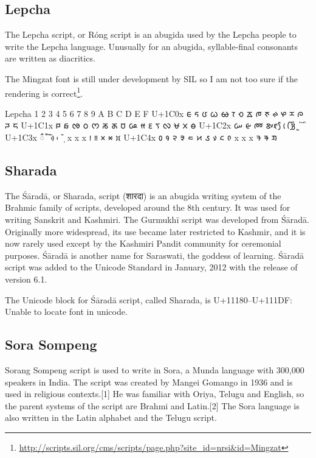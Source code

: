 \subsection{Lepcha}
\newfontfamily{}

The Lepcha script, or Róng script is an abugida used by the Lepcha people to write the Lepcha language. Unusually for an abugida, syllable-final consonants are written as diacritics.

The Mingzat font is still under development by SIL so I am not too sure if the rendering is correct\footnote{\url{http://scripts.sil.org/cms/scripts/page.php?site_id=nrsi&id=Mingzat}}.

\begin{scriptexample}[]{Lepcha}
\bgroup
\lepcha
{}	1	2	3	4	5	6	7	8	9	A	B	C	D	E	F
U+1C0x	 ᰀ	ᰁ	ᰂ	ᰃ	ᰄ	ᰅ	ᰆ	ᰇ	ᰈ	ᰉ	ᰊ	ᰋ	ᰌ	ᰍ	ᰎ	ᰏ
U+1C1x	 ᰐ	ᰑ	ᰒ	ᰓ	ᰔ	ᰕ	ᰖ	ᰗ	ᰘ	ᰙ	ᰚ	ᰛ	ᰜ	ᰝ	ᰞ	ᰟ
U+1C2x	 ᰠ	ᰡ	ᰢ	ᰣ	ᰤ	ᰥ	ᰦ	ᰧ	ᰨ	ᰩ	ᰪ	ᰫ	ᰬ	ᰭ	ᰮ	ᰯ
U+1C3x	 ᰰ	ᰱ	ᰲ	ᰳ	ᰴ	ᰵ	ᰶ	᰷	x	x	x	᰻	᰼	᰽	᰾	᰿
U+1C4x	 ᱀	᱁	᱂	᱃	᱄	᱅	᱆	᱇	᱈	᱉	x	x	x	ᱍ	ᱎ	ᱏ

\egroup
\end{scriptexample}

\subsection{Sharada}

The Śāradā, or Sharada, script (शारदा) is an abugida writing system of the Brahmic family of scripts, developed around the 8th century. It was used for writing Sanskrit and Kashmiri. The Gurmukhī script was developed from Śāradā. Originally more widespread, its use became later restricted to Kashmir, and it is now rarely used except by the Kashmiri Pandit community for ceremonial purposes. Śāradā is another name for Saraswati, the goddess of learning.
Śāradā script was added to the Unicode Standard in January, 2012 with the release of version 6.1.

The Unicode block for Śāradā script, called Sharada, is U+11180–U+111DF: Unable to locate font in unicode.


\subsection{Sora Sompeng}

Sorang Sompeng script is used to write in Sora, a Munda language with 300,000 speakers in India. The script was created by Mangei Gomango in 1936 and is used in religious contexts.[1] He was familiar with Oriya, Telugu and English, so the parent systems of the script are Brahmi and Latin.[2]
The Sora language is also written in the Latin alphabet and the Telugu script.

